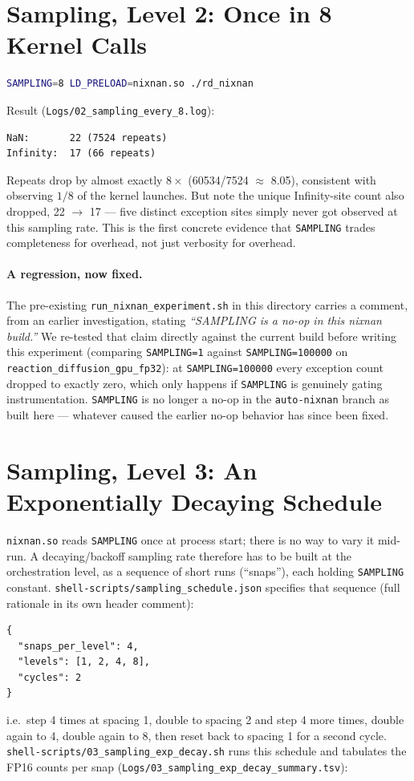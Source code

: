 \documentclass[11pt]{article}
\begin{document}
\section{Sampling, Level 2: Once in 8 Kernel Calls}

\begin{lstlisting}[language=bash]
SAMPLING=8 LD_PRELOAD=nixnan.so ./rd_nixnan
\end{lstlisting}
Result (\texttt{Logs/02\_sampling\_every\_8.log}):
\begin{lstlisting}
NaN:       22 (7524 repeats)
Infinity:  17 (66 repeats)
\end{lstlisting}
Repeats drop by almost exactly $8\times$ (60534/7524 $\approx$ 8.05), consistent with
observing $1/8$ of the kernel launches. But note the unique Infinity-site count also
dropped, 22 $\to$ 17 --- five distinct exception sites simply never got observed at this
sampling rate. This is the first concrete evidence that \texttt{SAMPLING} trades
completeness for overhead, not just verbosity for overhead.

\paragraph{A regression, now fixed.} The pre-existing \texttt{run\_nixnan\_experiment.sh}
in this directory carries a comment, from an earlier investigation, stating
\emph{``SAMPLING is a no-op in this nixnan build.''} We re-tested that claim directly
against the current build before writing this experiment (comparing \texttt{SAMPLING=1}
against \texttt{SAMPLING=100000} on \texttt{reaction\_diffusion\_gpu\_fp32}): at
\texttt{SAMPLING=100000} every exception count dropped to exactly zero, which only
happens if \texttt{SAMPLING} is genuinely gating instrumentation. \texttt{SAMPLING} is no
longer a no-op in the \texttt{auto-nixnan} branch as built here --- whatever caused the
earlier no-op behavior has since been fixed.

\section{Sampling, Level 3: An Exponentially Decaying Schedule}
\label{sec:exp-decay}

\texttt{nixnan.so} reads \texttt{SAMPLING} once at process start; there is no way to vary
it mid-run. A decaying/backoff sampling rate therefore has to be built at the
orchestration level, as a sequence of short runs (``snaps''), each holding
\texttt{SAMPLING} constant. \texttt{shell-scripts/sampling\_schedule.json} specifies that
sequence (full rationale in its own header comment):
\begin{lstlisting}
{
  "snaps_per_level": 4,
  "levels": [1, 2, 4, 8],
  "cycles": 2
}
\end{lstlisting}
i.e.\ step 4 times at spacing 1, double to spacing 2 and step 4 more times, double again
to 4, double again to 8, then reset back to spacing 1 for a second cycle.
\texttt{shell-scripts/03\_sampling\_exp\_decay.sh} runs this schedule and tabulates the
FP16 counts per snap (\texttt{Logs/03\_sampling\_exp\_decay\_summary.tsv}):
\end{document}
